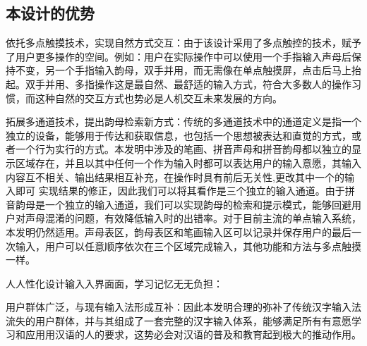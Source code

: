 
  \subsection{本设计的优势}

  依托多点触摸技术，实现⾃然⽅式交互：由于该设计采用了多点触控的技术，赋予了用户更多操作的空间。例如：用户在实际操作中可以使用一个手指输入声母后保持不变，另一个手指输入韵母，双手并用，而无需像在单点触摸屏，点击后马上抬起。双⼿并用、多指操作这是最自然、最舒适的输⼊方式，符合⼤多数⼈的操作习惯，而这种自然的交互⽅式也势必是人机交互未来发展的⽅向。

  拓展多通道技术，提出韵母检索新⽅式：传统的多通道技术中的通道定义是指一个独立的设备，能够⽤于传达和获取信息，也包括一个思想被表达和直觉的⽅式，或者一个⾏为实行的⽅式。本发明中涉及的笔画、拼⾳声母和拼⾳韵母都以独立的显示区域存在，并且以其中任何一个作为输⼊时都可以表达⽤户的输⼊意愿，其输入内容互不相关、输出结果相互补充，在操作时具有前后⽆关性,更改其中一个的输⼊即可 实现结果的修正，因此我们可以将其看作是三个独立的输⼊通道。由于拼⾳韵母是一个独⽴的输⼊通道，我们可以实现韵母的检索和提示模式，能够回避⽤户对声母混淆的问题，有效降低输入时的出错率。对于⽬前主流的单点输⼊系统，本发明仍然适用。声母表区，韵母表区和笔画输⼊区可以记录并保存⽤户的最后一次输入，用户可以任意顺序依次在三个区域完成输入，其他功能和⽅法与多点触摸一样。

  ⼈人性化设计输⼊入界⾯面，学习记忆⽆无负担：

  ⽤户群体广泛，与现有输⼊法形成互补：因此本发明合理的弥补了传统汉字输入法流失的⽤户群体，并与其组成了一套完整的汉字输⼊体系，能够满足所有有意愿学习和应⽤用汉语的人的要求，这势必会对汉语的普及和教育起到极大的推动作用。
